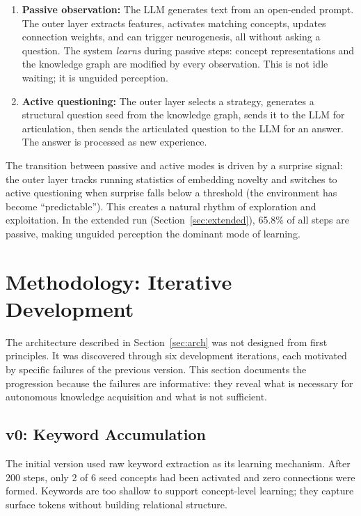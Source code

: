 \documentclass[conference]{IEEEtran}
\begin{document}
\begin{enumerate}[leftmargin=*]
\item \textbf{Passive observation:} The LLM generates text from an open-ended prompt. The outer layer extracts features, activates matching concepts, updates connection weights, and can trigger neurogenesis, all without asking a question. The system \emph{learns} during passive steps: concept representations and the knowledge graph are modified by every observation. This is not idle waiting; it is unguided perception.
\item \textbf{Active questioning:} The outer layer selects a strategy, generates a structural question seed from the knowledge graph, sends it to the LLM for articulation, then sends the articulated question to the LLM for an answer. The answer is processed as new experience.
\end{enumerate}

The transition between passive and active modes is driven by a surprise signal: the outer layer tracks running statistics of embedding novelty and switches to active questioning when surprise falls below a threshold (the environment has become ``predictable''). This creates a natural rhythm of exploration and exploitation. In the extended run (Section~\ref{sec:extended}), 65.8\% of all steps are passive, making unguided perception the dominant mode of learning.


\section{Methodology: Iterative Development}
\label{sec:method}

The architecture described in Section~\ref{sec:arch} was not designed from first principles. It was discovered through six development iterations, each motivated by specific failures of the previous version. This section documents the progression because the failures are informative: they reveal what is necessary for autonomous knowledge acquisition and what is not sufficient.

\subsection{v0: Keyword Accumulation}

The initial version used raw keyword extraction as its learning mechanism. After 200 steps, only 2 of 6 seed concepts had been activated and zero connections were formed. Keywords are too shallow to support concept-level learning; they capture surface tokens without building relational structure.
\end{document}
